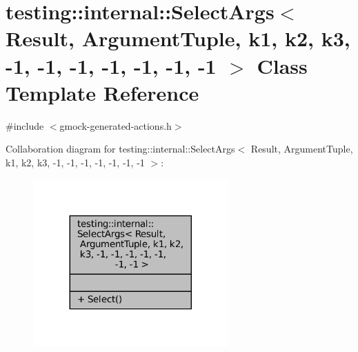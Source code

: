 \hypertarget{classtesting_1_1internal_1_1SelectArgs_3_01Result_00_01ArgumentTuple_00_01k1_00_01k2_00_01k3_00_4b8877f94cb457a4d2bd6b2630090309}{}\section{testing\+:\+:internal\+:\+:Select\+Args$<$ Result, Argument\+Tuple, k1, k2, k3, -\/1, -\/1, -\/1, -\/1, -\/1, -\/1, -\/1 $>$ Class Template Reference}
\label{classtesting_1_1internal_1_1SelectArgs_3_01Result_00_01ArgumentTuple_00_01k1_00_01k2_00_01k3_00_4b8877f94cb457a4d2bd6b2630090309}


{\ttfamily \#include $<$gmock-\/generated-\/actions.\+h$>$}



Collaboration diagram for testing\+:\+:internal\+:\+:Select\+Args$<$ Result, Argument\+Tuple, k1, k2, k3, -\/1, -\/1, -\/1, -\/1, -\/1, -\/1, -\/1 $>$\+:
\nopagebreak
\begin{figure}[H]
\begin{center}
\leavevmode
\includegraphics[width=212pt]{classtesting_1_1internal_1_1SelectArgs_3_01Result_00_01ArgumentTuple_00_01k1_00_01k2_00_01k3_00_66e696861bb8f82b719131b8720f04ec}
\end{center}
\end{figure}
